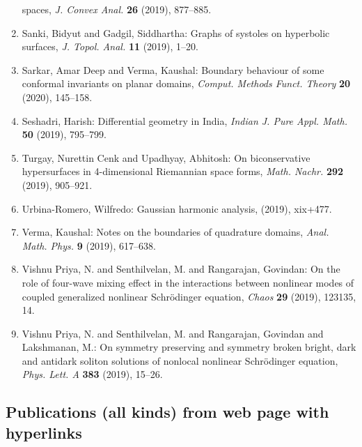 \begin{enumerate}
spaces, \emph{J. Convex Anal.} {\bf 26} (2019), 877--885.
\item Sanki, Bidyut and Gadgil, Siddhartha: Graphs of systoles on hyperbolic surfaces, \emph{J. Topol. Anal.} {\bf 11} (2019), 1--20.
\item Sarkar, Amar Deep and Verma, Kaushal: Boundary behaviour of some conformal invariants on planar
domains, \emph{Comput. Methods Funct. Theory} {\bf 20} (2020), 145--158.
\item Seshadri, Harish: Differential geometry in {I}ndia, \emph{Indian J. Pure Appl. Math.} {\bf 50} (2019), 795--799.
\item Turgay, Nurettin Cenk and Upadhyay, Abhitosh: On biconservative hypersurfaces in 4-dimensional {R}iemannian
space forms, \emph{Math. Nachr.} {\bf 292} (2019), 905--921.
\item Urbina-Romero, Wilfredo: Gaussian harmonic analysis, \emph{} {\bf } (2019), xix+477.
\item Verma, Kaushal: Notes on the boundaries of quadrature domains, \emph{Anal. Math. Phys.} {\bf 9} (2019), 617--638.
\item Vishnu Priya, N. and Senthilvelan, M. and Rangarajan,
Govindan: On the role of four-wave mixing effect in the interactions
between nonlinear modes of coupled generalized nonlinear
{S}chr\"{o}dinger equation, \emph{Chaos} {\bf 29} (2019), 123135, 14.
\item Vishnu Priya, N. and Senthilvelan, M. and Rangarajan, Govindan
and Lakshmanan, M.: On symmetry preserving and symmetry broken bright, dark and
antidark soliton solutions of nonlocal nonlinear {S}chr\"{o}dinger
equation, \emph{Phys. Lett. A} {\bf 383} (2019), 15--26.
\end{enumerate}

\subsection{Publications (all kinds) from web page with hyperlinks}

